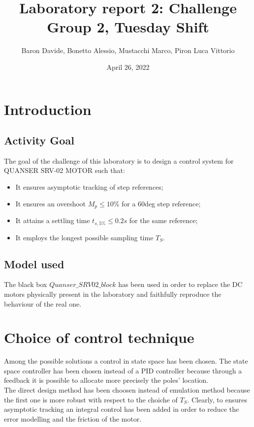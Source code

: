 \documentclass[11pt]{article}
\title{
	{\Large Laboratory report 2: Challenge \\
	 \large Group 2, Tuesday Shift}
}
\author{Baron Davide, Bonetto Alessio, Mustacchi Marco, Piron Luca Vittorio}
\date{April 26, 2022}
\begin{document}
\maketitle

\section{Introduction}

	\subsection{Activity Goal}
	The goal of the challenge of this laboratory is to design a control system for QUANSER SRV-02 MOTOR such that:

	\begin{itemize}
		\item It ensures asymptotic tracking of step references;
		\item It ensures an overshoot $M_p \le 10\%$ for a 60deg step reference;
		\item It attains a settling time $t_{s,5\%} \le 0.2s$ for the same reference;
		\item It employs the longest possible sampling time $T_S$.
	\end{itemize}

	\subsection{Model used}
	The black box $\textit{Quanser\_SRV02\_block}$ has been used in order to replace the DC motors physically present in the laboratory
	and faithfully reproduce the behaviour of the real one.


\section{Choice of control technique}

Among the possible solutions a control in state space has been chosen. 
The state space controller has been chosen instead of a PID controller because through a feedback it is possible to allocate more precisely the poles' location. \\
The direct design method has been choosen instead of emulation method because the first one is more robust with respect to the choiche of $T_S$.
Clearly, to ensures asymptotic tracking an integral control has been added in order to reduce the error modelling and the friction of the motor.
\end{document}
